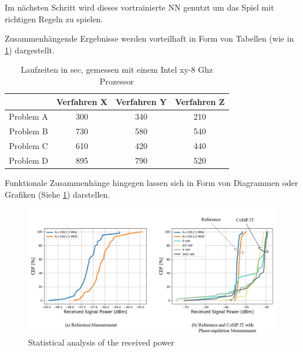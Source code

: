 Im nächsten Schritt wird dieses vortrainierte NN genutzt um das Spiel mit richtigen Regeln zu spielen.



Zusammenhängende Ergebnisse werden vorteilhaft in Form von Tabellen (wie in \ref{TabLaufzeiten}) dargestellt.

\begin{table}[h!]
	\begin{center}
        \caption{Laufzeiten in sec, gemessen mit einem Intel xy-8 Ghz Prozessor}\label{TabLaufzeiten}
		\begin{tabular}{|c||c|c|c|}
			\hline 
			& Verfahren X & Verfahren Y & Verfahren Z \\ 
			\hline 
			\hline 
			\hspace{.1cm}
			Problem A & 300 & 340 & 210 \\ 
			\hline 
			\hspace{.1cm}
			Problem B & 730 & 580 & 540 \\ 
			\hline 
			\hspace{.1cm}
			Problem C & 610 & 420 & 440 \\ 
			\hline 
			\hspace{.1cm}
			Problem D & 895 & 790 & 520 \\ 
			\hline 
		\end{tabular} 
	\end{center}
\end{table}


Funktionale Zusammenhänge hingegen lassen sich in Form von Diagrammen oder Grafiken (Siehe \ref{fig:Abbildung1}) darstellen.


\begin{figure}[!htb]
	\centering
	\includegraphics[width=1\textwidth]{Bilder/Abbildung1}
	\caption{Statistical analysis of the received power}
	\label{fig:Abbildung1}
\end{figure}

